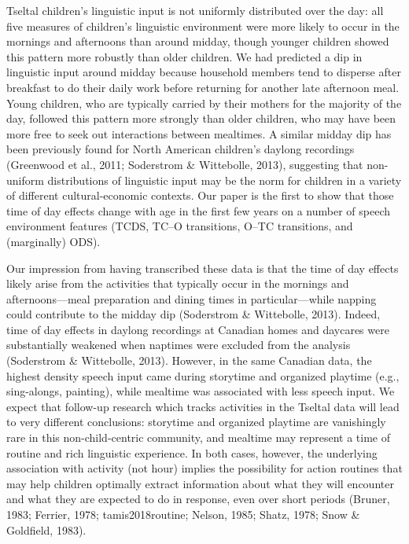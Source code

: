 \documentclass[floatsintext,man]{apa6}
\theoremstyle{definition}
\theoremstyle{definition}
\theoremstyle{definition}
\theoremstyle{remark}
\begin{document}
Tseltal children's linguistic input is not uniformly distributed over
the day: all five measures of children's linguistic environment were
more likely to occur in the mornings and afternoons than around midday,
though younger children showed this pattern more robustly than older
children. We had predicted a dip in linguistic input around midday
because household members tend to disperse after breakfast to do their
daily work before returning for another late afternoon meal. Young
children, who are typically carried by their mothers for the majority of
the day, followed this pattern more strongly than older children, who
may have been more free to seek out interactions between mealtimes. A
similar midday dip has been previously found for North American
children's daylong recordings (Greenwood et al., 2011; Soderstrom \&
Wittebolle, 2013), suggesting that non-uniform distributions of
linguistic input may be the norm for children in a variety of different
cultural-economic contexts. Our paper is the first to show that those
time of day effects change with age in the first few years on a number
of speech environment features (TCDS, TC--O transitions, O--TC
transitions, and (marginally) ODS).

Our impression from having transcribed these data is that the time of
day effects likely arise from the activities that typically occur in the
mornings and afternoons---meal preparation and dining times in
particular---while napping could contribute to the midday dip
(Soderstrom \& Wittebolle, 2013). Indeed, time of day effects in daylong
recordings at Canadian homes and daycares were substantially weakened
when naptimes were excluded from the analysis (Soderstrom \& Wittebolle,
2013). However, in the same Canadian data, the highest density speech
input came during storytime and organized playtime (e.g., sing-alongs,
painting), while mealtime was associated with less speech input. We
expect that follow-up research which tracks activities in the Tseltal
data will lead to very different conclusions: storytime and organized
playtime are vanishingly rare in this non-child-centric community, and
mealtime may represent a time of routine and rich linguistic experience.
In both cases, however, the underlying association with activity (not
hour) implies the possibility for action routines that may help children
optimally extract information about what they will encounter and what
they are expected to do in response, even over short periods (Bruner,
1983; Ferrier, 1978; tamis2018routine; Nelson, 1985; Shatz, 1978; Snow
\& Goldfield, 1983).
\end{document}
